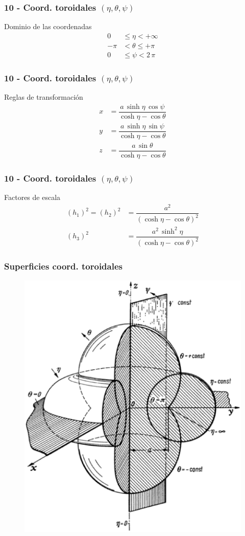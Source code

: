 \documentclass[12pt]{beamer}
\begin{document}
\begin{frame}
\frametitle{10 - Coord. toroidales $(\eta, \theta, \psi)$}
\fontsize{12}{12}\selectfont
Dominio de las coordenadas
\begin{align*}
0 &\leq \eta < +\infty \\
-\pi &< \theta \leq +\pi \\
0 &\leq \psi < 2\, \pi
\end{align*}
\end{frame}
\begin{frame}
\frametitle{10 - Coord. toroidales $(\eta, \theta, \psi)$}
\fontsize{12}{12}\selectfont
Reglas de transformación
\begin{align*}
x &= \dfrac{a \, \sinh \eta \, \cos \psi}{\cosh \eta - \cos \theta} \\[0.5em]
y &= \dfrac{a \, \sinh \eta \, \sin \psi}{\cosh \eta - \cos \theta} \\[0.5em]
z &= \dfrac{a \, \sin \theta}{\cosh \eta - \cos \theta}
\end{align*}
\end{frame}
\begin{frame}
\frametitle{10 - Coord. toroidales $(\eta, \theta, \psi)$}
\fontsize{12}{12}\selectfont
Factores de escala
\begin{align*}
(h_{1})^{2} = (h_{2})^{2} &= \dfrac{a^{2}}{(\cosh \eta - \cos \theta)^{2}} \\[0.5em]
(h_{3})^{2} &= \dfrac{a^{2} \, \sinh^{2} \eta}{(\cosh \eta - \cos \theta)^{2}}
\end{align*}
\end{frame}
\begin{frame}
\frametitle{Superficies coord. toroidales}
\begin{figure}[H]
\centering
\includegraphics[scale=0.25]{Imagenes/Sistema_Toroidal.eps}
\end{figure}
\end{frame}
\end{document}
